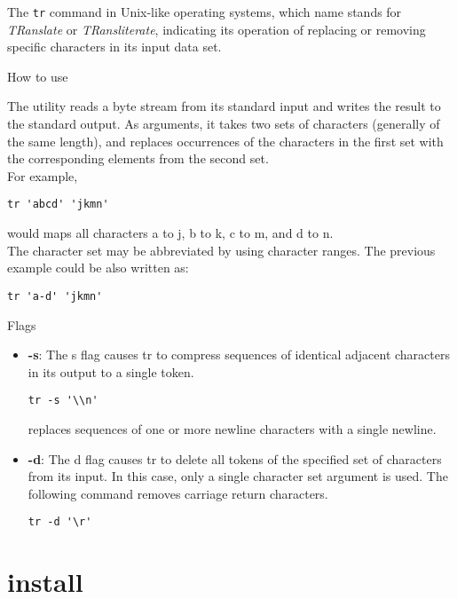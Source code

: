 \documentclass[hidelinks,12pt,a4paper,numbers=enddot]{scrartcl}
\begin{document}
The \texttt{tr} command in Unix-like operating systems, which name stands for
\emph{TRanslate} or \emph{TRansliterate}, indicating its operation of replacing or removing
specific characters in its input data set.

How to use

The utility reads a byte stream from its standard input and writes the
result to the standard output. As arguments, it takes two sets of
characters (generally of the same length), and replaces occurrences of
the characters in the first set with the corresponding elements from the
second set.\\

For example,
\begin{verbatim}
tr 'abcd' 'jkmn'
\end{verbatim}

would maps all characters a to j, b to k, c to m, and d to n.\\
The character set may be abbreviated by using character ranges. The
previous example could be also written as:

\begin{verbatim}
tr 'a-d' 'jkmn'
\end{verbatim}


Flags
\begin{itemize}
    \item  \textbf{-s}: The s flag causes tr to compress sequences of identical
        adjacent characters in its output to a single token.
\begin{verbatim}
tr -s '\\n'
\end{verbatim}
        replaces sequences of one or more newline characters with a single
        newline.
    
    \item  \textbf{-d}: The d flag causes tr to delete all tokens of the specified
        set of characters from its input. In this case, only a single character
        set argument is used. The following command removes carriage return
        characters.
\begin{verbatim}
tr -d '\r'
\end{verbatim}
    
\end{itemize}

\section{install}
\end{document}
